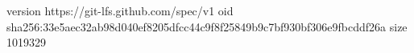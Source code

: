 version https://git-lfs.github.com/spec/v1
oid sha256:33e5aec32ab98d040ef8205dfcc44c9f8f25849b9c7bf930bf306e9fbcddf26a
size 1019329
